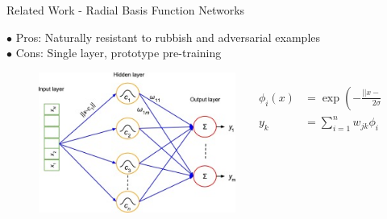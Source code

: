 \documentclass{beamer}
\begin{document}
\begin{frame}{Related Work - Radial Basis Function Networks}
    \begin{block}{}
        $\bullet$ Pros: Naturally resistant to rubbish and adversarial examples\\
        $\bullet$ Cons: Single layer, prototype pre-training
    \end{block}
    
    \begin{figure} 
    \begin{columns}
    \begin{column}{.49\textwidth}
       \includegraphics[width=0.99\textwidth]{images/Related-Work/RBF-net-low-qual.jpg}
    \end{column}
    
    \begin{column}{.49\textwidth}
        \begin{align*}
        \phi_i(x) &= \exp (-\frac{||x-c_i||^2}{2\sigma_i^2})\\
        y_k &= \sum_{i=1}^n w_{jk}\phi_i(x)
        \end{align*}
    \end{column}
    \end{columns}
    \caption*{\cite{samui2017handbook} \\
    \cite{chenou2019radial} }
    \end{figure} 

\end{frame}

\end{document}
